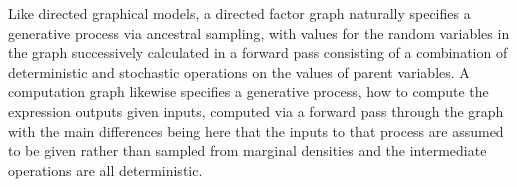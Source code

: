
Like directed graphical models, a directed factor graph naturally specifies a generative process via ancestral sampling, with values for the random variables in the graph successively calculated in a forward pass consisting of a combination of deterministic and stochastic operations on the values of parent variables. A computation graph likewise specifies a generative process, how to compute the expression outputs given inputs, computed via a forward pass through the graph with the main differences being here that the inputs to that process are assumed to be given rather than sampled from marginal densities and the intermediate operations are all deterministic.


